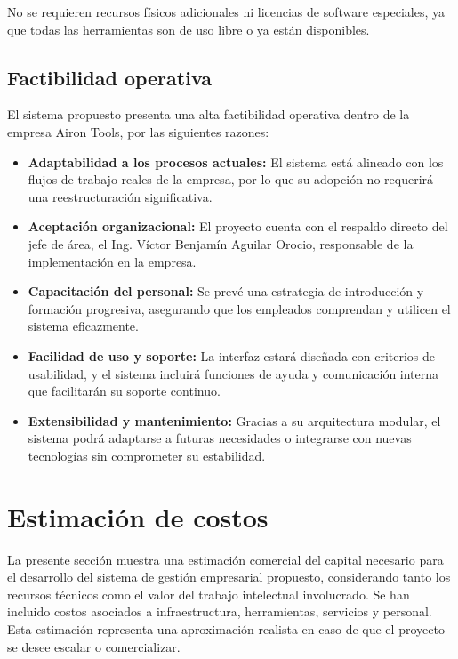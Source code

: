 No se requieren recursos físicos adicionales ni licencias de software especiales, ya que todas las herramientas son de uso libre o ya están disponibles.

\subsection{Factibilidad operativa}

El sistema propuesto presenta una alta factibilidad operativa dentro de la empresa Airon Tools, por las siguientes razones:

\begin{itemize}
	\item \textbf{Adaptabilidad a los procesos actuales:} El sistema está alineado con los flujos de trabajo reales de la empresa, por lo que su adopción no requerirá una reestructuración significativa.
	
	\item \textbf{Aceptación organizacional:} El proyecto cuenta con el respaldo directo del jefe de área, el Ing. Víctor Benjamín Aguilar Orocio, responsable de la implementación en la empresa.
	
	\item \textbf{Capacitación del personal:} Se prevé una estrategia de introducción y formación progresiva, asegurando que los empleados comprendan y utilicen el sistema eficazmente.
	
	\item \textbf{Facilidad de uso y soporte:} La interfaz estará diseñada con criterios de usabilidad, y el sistema incluirá funciones de ayuda y comunicación interna que facilitarán su soporte continuo.
	
	\item \textbf{Extensibilidad y mantenimiento:} Gracias a su arquitectura modular, el sistema podrá adaptarse a futuras necesidades o integrarse con nuevas tecnologías sin comprometer su estabilidad.
\end{itemize}


\vspace{0.5cm}\vspace{0.5cm}
\section{Estimación de costos}

La presente sección muestra una estimación comercial del capital necesario para el desarrollo del sistema de gestión empresarial propuesto, considerando tanto los recursos técnicos como el valor del trabajo intelectual involucrado. Se han incluido costos asociados a infraestructura, herramientas, servicios y personal. Esta estimación representa una aproximación realista en caso de que el proyecto se desee escalar o comercializar.

